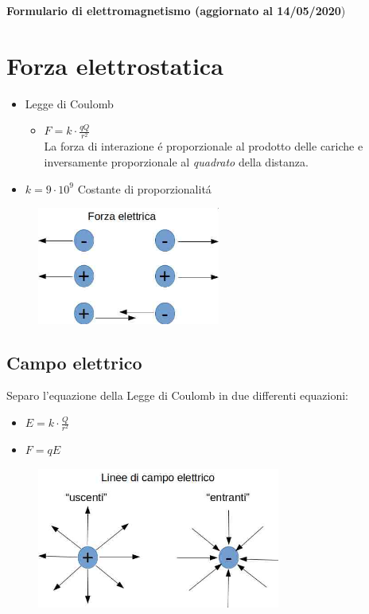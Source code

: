 \documentclass[17pt]{article}
\begin{document}
\begin{center}
	{\bf Formulario di elettromagnetismo (aggiornato al 14/05/2020})
\end{center}


\section{Forza elettrostatica}


\begin{itemize}
	\item Legge di Coulomb         
		\begin{itemize}
			\item $F = k\cdot\frac{qQ}{r^2}$\\
			La forza di interazione \'e proporzionale al prodotto delle cariche e inversamente proporzionale al \emph{quadrato} della distanza.
		\end{itemize}			
	\item $k = 9\cdot 10^{9}$ Costante di proporzionalit\'a        
\end{itemize}



\begin{figure}[th]
\includegraphics[width=6cm]{forzaElettrica.jpg}
\centering
\end{figure}






\subsection{Campo elettrico}

Separo l'equazione della Legge di Coulomb in due differenti equazioni:
      
\begin{itemize}
	\item $E = k\cdot\frac{Q}{r^2}$ 
	\item $F = qE$
\end{itemize}			


\begin{figure}[th]
\includegraphics[width=8cm]{lineeCampoElettrico.jpg}
\centering
\end{figure}
\end{document}
